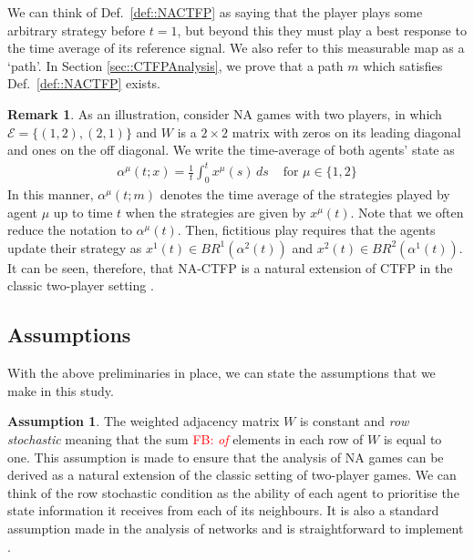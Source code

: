 \documentclass{article}
\theoremstyle{definition}
\newtheorem{assumption}{Assumption}
\newtheorem*{remark}{Remark}
\newcommand{\fb}[1]{\textcolor{red}{FB: \textit{#1}}}
\newcommand{\edgeset}{\mathcal{E}}
\newcommand{\weightset}{W}
\newcommand{\xmu}{x^{\mu}}
\begin{document}
  We can think of Def.~\ref{def::NACTFP} as saying that the player plays some arbitrary strategy before
  $t = 1$, but beyond this they must play a best response to the time average of its reference
  signal. We also refer to this measurable map as a `path'. In Section \ref{sec::CTFPAnalysis}, we prove that a path $m$ which satisfies Def.~\ref{def::NACTFP} exists.
  
  \begin{remark}
    As an illustration, consider NA games with two players, in which $\edgeset = \{(1, 2),
    (2, 1)\}$ and $\weightset$ is a $2\times 2$ matrix with zeros on its leading diagonal and ones on
    the off diagonal. We write the time-average of both agents' state as
    \begin{align*}
      \alpha^\mu(t; x) = \frac{1}{t} \int_0^t \xmu(s) \, ds & \text{ for $\mu \in \{1, 2\}$}
    \end{align*}
    In this manner, $\alpha^\mu(t; m)$ denotes the time average of the strategies played by
    agent $\mu$ up to time $t$ when the strategies are given by $\xmu(t)$. Note that we often reduce the notation to $\alpha^\mu(t)$. Then, fictitious play requires that the agents update their
    strategy as $x^1(t) \in BR^1(\alpha^2(t))$ and $x^2(t) \in BR^2(\alpha^1(t))$. It can be
    seen, therefore, that NA-CTFP is a natural extension of CTFP in the classic
    two-player setting \cite{Hofbauer2006}.
  \end{remark}

\subsection{Assumptions}

  With the above preliminaries in place, we can state the assumptions that we make in this study.

  \begin{assumption}\label{ass::rowstochastic}
    The weighted adjacency matrix $\weightset$ is constant and
    \emph{row stochastic} meaning that the sum \fb{of} elements in each row of
    $\weightset$ is equal to one. This assumption is made to ensure
    that the analysis of NA games can be derived as a natural
    extension of the classic setting of two-player games. We can
    think of the row stochastic condition as the ability of each agent
    to prioritise the state information it receives from each of its
    neighbours. It is also a standard assumption made in the analysis
    of networks and is straightforward to implement \cite{Mai2019}.
  \end{assumption}
\end{document}

